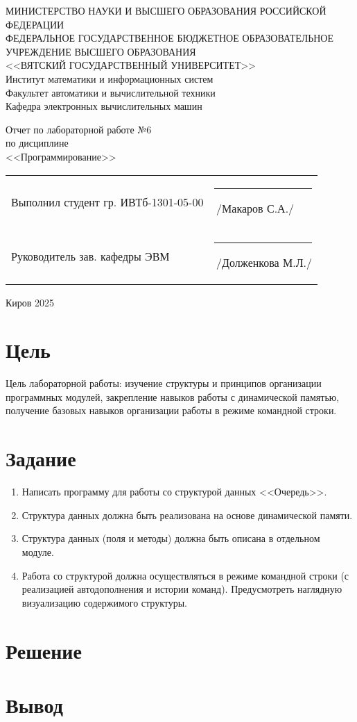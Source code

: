 \documentclass[a4paper,14pt]{extarticle}
\begin{document}
	\newpage\thispagestyle{empty}
	\begin{center}
		\MakeUppercase{
			Министерство науки и высшего образования Российской Федерации\\
			Федеральное государственное бюджетное образовательное учреждение высшего образования\\
			<<Вятский Государственный Университет>>\\
		}
		Институт математики и информационных систем\\
		Факультет автоматики и вычислительной техники\\
		Кафедра электронных вычислительных машин
	\end{center}
	\vfill
	
	\begin{center}
		Отчет по лабораторной работе №6\\
		по дисциплине\\
		<<Программирование>>\\
	\end{center}
	\vfill
	
	\noindent
	\begin{tabular}{ll}
		Выполнил студент гр. ИВТб-1301-05-00 \hspace{5mm} &
		\rule[-1mm]{25mm}{0.10mm}\,/Макаров С.А./\\
		
		Руководитель зав. кафедры ЭВМ & \rule[-1mm]{25mm}{0.10mm}\,/Долженкова М.Л./\\
	\end{tabular}
	
	\vfill
	\begin{center}
		Киров 2025
	\end{center}
	
	\newpage
	\section*{Цель}
	Цель лабораторной работы: изучение структуры и принципов организации программных модулей, закрепление навыков работы с динамической памятью, получение базовых навыков организации работы в режиме командной строки.
	
	\section*{Задание}
	\begin{enumerate}
		\item Написать программу для работы со структурой данных <<Очередь>>.
		\item Структура данных должна быть реализована на основе динамической памяти.
		\item Структура данных (поля и методы) должна быть описана в отдельном модуле.
		\item Работа со структурой должна осуществляться в режиме командной строки (с реализацией автодополнения и истории команд). Предусмотреть наглядную визуализацию содержимого структуры.
	\end{enumerate}
	
	\newpage
	\section*{Решение}
	
	\section*{Вывод}
\end{document}
